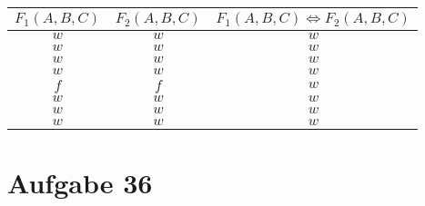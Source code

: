\documentclass[10pt, oneside]{article}
\begin{document}
\begin{table*}[h]
\begin{minipage}{1\linewidth}
\begin{tabular}{|c|c|c|}
            \hline
            $F_1(A, B, C)$ & $F_2(A, B, C)$ & $F_1(A, B, C) \Leftrightarrow F_2(A, B, C)$ \\
            \hline
            $w$ & $w$ & $w$ \\
            \hline
            $w$ & $w$ & $w$ \\
            \hline
            $w$ & $w$ & $w$ \\
            \hline
            $w$ & $w$ & $w$ \\
            \hline
            $f$ & $f$ & $w$ \\
            \hline
            $w$ & $w$ & $w$ \\
            \hline
            $w$ & $w$ & $w$ \\
            \hline
            $w$ & $w$ & $w$ \\
            \hline
        \end{tabular}
    \end{minipage}
\end{table*}

\section{Aufgabe 36}
\end{document}
